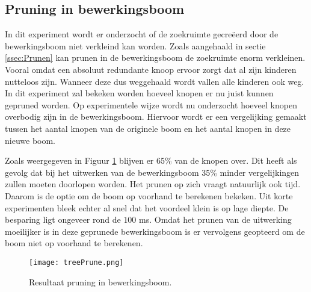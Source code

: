 \documentclass[Main.tex]{subfiles}
\begin{document}
\subsection{Pruning in bewerkingsboom} \label{ssec:pruning}
In dit experiment wordt er onderzocht of de zoekruimte gecre\"eerd door de bewerkingsboom niet verkleind kan worden. Zoals aangehaald in sectie \ref{ssec:Prunen} kan prunen in de bewerkingsboom de zoekruimte enorm verkleinen. Vooral omdat een absoluut redundante knoop ervoor zorgt dat al zijn kinderen nutteloos zijn. Wanneer deze dus weggehaald wordt vallen alle kinderen ook weg. In dit experiment zal bekeken worden hoeveel knopen er nu juist kunnen gepruned worden. Op experimentele wijze wordt nu onderzocht hoeveel knopen overbodig zijn in de bewerkingsboom. Hiervoor wordt er een vergelijking gemaakt tussen het aantal knopen van de originele boom en het aantal knopen in deze nieuwe boom.
\par Zoals weergegeven in Figuur \ref{fig:pruningInBewerkingsboom} blijven er 65\% van de knopen over. Dit heeft als gevolg dat bij het uitwerken van de bewerkingsboom 35\% minder vergelijkingen zullen moeten doorlopen worden. Het prunen op zich vraagt natuurlijk ook tijd. Daarom is de optie om de boom op voorhand te berekenen bekeken. Uit korte experimenten bleek echter al snel dat het voordeel klein is op lage diepte. De besparing ligt ongeveer rond de $100$ ms. Omdat het prunen van de uitwerking moeilijker is in deze geprunede bewerkingsboom is er vervolgens geopteerd om de boom niet op voorhand te berekenen.
\begin{figure}
\centering
\texttt{[image: treePrune.png]} 
\caption{Resultaat pruning in bewerkingsboom.} \label{fig:pruningInBewerkingsboom}
\end{figure}
\end{document}
